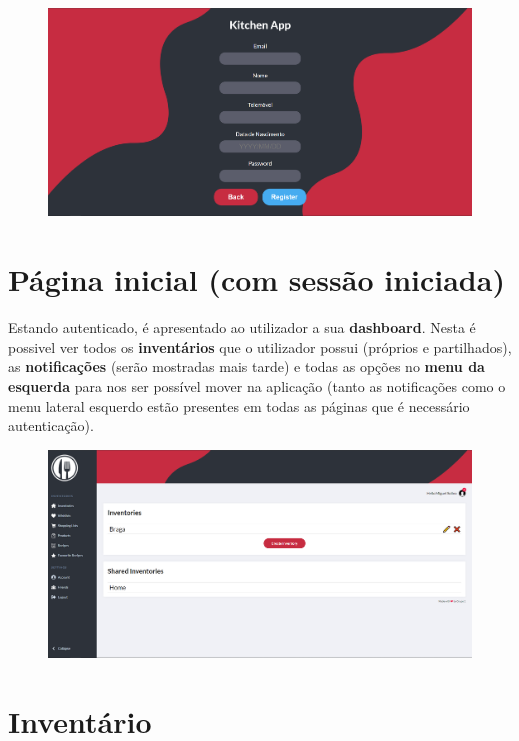 \documentclass[a4paper]{report}
\begin{document}
    \begin{figure}[H]
        \centering
            \includegraphics[width=\textwidth]{images/produto_final/registo.png}
    \end{figure}

    \section{Página inicial (com sessão iniciada)}

    Estando autenticado, é apresentado ao utilizador a sua \textbf{dashboard}.
    Nesta é possivel ver todos os \textbf{inventários} que o utilizador possui
    (próprios e partilhados), as \textbf{notificações} (serão mostradas mais 
    tarde) e todas as opções no \textbf{menu da esquerda} para nos ser 
    possível mover na aplicação (tanto as notificações como o menu lateral 
    esquerdo estão presentes em todas as páginas que é necessário 
    autenticação).

    \begin{figure}[H]
        \centering
            \includegraphics[width=\textwidth]{images/produto_final/inicial.png}
    \end{figure}

    \section{Inventário}
\end{document}
